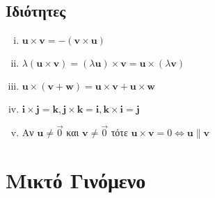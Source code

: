 \documentclass[a4paper,table]{report}
\begin{document}
{  \subsection*{Ιδιότητες}

  \begin{enumerate}[i)]
    \item $ \mathbf{u} \times \mathbf{v} = - (\mathbf{v} \times \mathbf{u}) $
    \item $ \lambda (\mathbf{u} \times \mathbf{v}) = (\lambda \mathbf{u}) \times \mathbf{v}
      = \mathbf{u} \times (\lambda \mathbf{v}) $ 
    \item $ \mathbf{u} \times (\mathbf{v}+ \mathbf{w}) = \mathbf{u} \times \mathbf{v}+ 
      \mathbf{u} \times \mathbf{w} $
    \item $ \mathbf{i} \times \mathbf{j} = \mathbf{k}, \mathbf{j} \times \mathbf{k} =
      \mathbf{i}, \mathbf{k} \times \mathbf{i} = \mathbf{j} $
    \item Αν $ \mathbf{u} \neq \vec{0} $ και $ \mathbf{v} \neq \vec{0} $ τότε 
      $ \mathbf{u} \times \mathbf{v}= 0 \Leftrightarrow \mathbf{u} \parallel \mathbf{v} $ 
  \end{enumerate}
}


\section*{Μικτό Γινόμενο}
\end{document}
